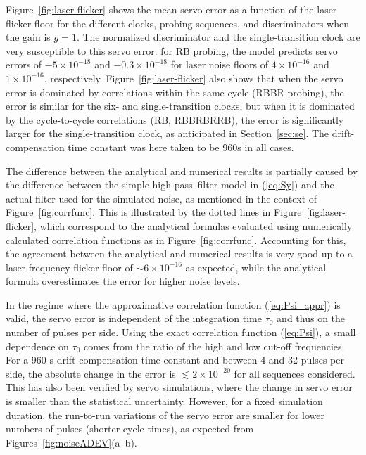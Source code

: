 \documentclass[10pt,a4paper]{iopart}
\newcommand{\eqref}[1]{(\ref{#1})}
\begin{document}
Figure~\ref{fig:laser-flicker} shows the mean servo error as a function of the laser flicker floor for the different clocks, probing sequences, and discriminators when the gain is $g=1$.
The normalized discriminator and the single-transition clock are very susceptible to this servo error: for RB probing, the model predicts servo errors of $-5\times 10^{-18}$ and $-0.3\times 10^{-18}$ for laser noise floors of $4\times 10^{-16}$ and $1\times 10^{-16}$, respectively.
Figure~\ref{fig:laser-flicker} also shows that when the servo error is dominated by correlations within the same cycle (RBBR probing), the error is similar for the six- and single-transition clocks, but when it is dominated by the cycle-to-cycle correlations (RB, RBBRBRRB), the error is significantly larger for the single-transition clock, as anticipated in Section~\ref{sec:se}.
The drift-compensation time constant was here taken to be 960\;s in all cases.

The difference between the analytical and numerical results is partially caused by the difference between the simple high-pass--filter model in \eqref{eq:Sy} and the actual filter used for the simulated noise, as mentioned in the context of Figure~\ref{fig:corrfunc}.
This is illustrated by the dotted lines in Figure~\ref{fig:laser-flicker}, which correspond to the analytical formulas evaluated using numerically calculated correlation functions as in Figure~\ref{fig:corrfunc}. Accounting for this, the agreement between the analytical and numerical results is very good up to a laser-frequency flicker floor of ${\sim}6\times 10^{-16}$ as expected, while the analytical formula overestimates the error for higher noise levels.

In the regime where the approximative correlation function \eqref{eq:Psi_appr} is valid, the servo error is independent of the integration time $\tau_0$ and thus on the number of pulses per side. Using the exact correlation function \eqref{eq:Psi}, a small dependence on $\tau_0$ comes from the ratio of the high and low cut-off frequencies. For a 960-s drift-compensation time constant and between 4 and 32 pulses per side, the absolute change in the error is ${\lesssim} 2\times 10^{-20}$ for all sequences considered. This has also been verified by servo simulations, where the change in servo error is smaller than the statistical uncertainty.
However, for a fixed simulation duration, the run-to-run variations of the servo error are smaller for lower numbers of pulses (shorter cycle times), as expected from Figures~\ref{fig:noiseADEV}(a--b).
\end{document}
